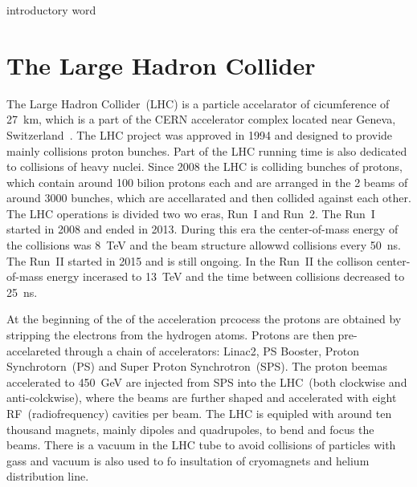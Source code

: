 \clearpage

\setcounter{secnumdepth}{4}
\setcounter{secnumdepth}{5}

introductory word

\section{The Large Hadron Collider}

The Large Hadron Collider~(LHC) is a particle accelarator of cicumference of 27~km, which is a part of the CERN accelerator complex located near Geneva, Switzerland~\cite{CERN-Brochure-2017-002-Eng, Evans:2008zzb}. The LHC project was approved in 1994 and designed to provide mainly collisions proton bunches. Part of the LHC running time is also dedicated to collisions of heavy nuclei. Since 2008 the LHC is colliding bunches of protons, which contain around 100 bilion protons each and are arranged in the 2 beams of around 3000 bunches, which are accellarated and then collided against each other. The LHC operations is divided two wo eras, Run~I and Run~2. The Run~I started in 2008 and ended in 2013. During this era the center-of-mass energy of the collisions was 8~TeV and the beam structure allowwd collisions every 50~ns. The Run~II started in 2015 and is still ongoing. In the Run~II the collison center-of-mass energy incerased to 13~TeV and the time between collisions decreased to 25~ns.

At the beginning of the of the acceleration prcocess the protons are obtained by stripping the electrons from the hydrogen atoms. Protons are then pre-accelareted through a chain of accelerators: Linac2, PS Booster, Proton Synchrotorn~(PS) and Super Proton Synchrotron~(SPS). The proton beemas accelerated to 450~GeV are injected from SPS into the LHC~(both clockwise and anti-colckwise), where the beams are further shaped and accelerated with eight RF~(radiofrequency) cavities per beam. The LHC is equipled with around ten thousand magnets, mainly dipoles and quadrupoles, to bend and focus the beams. There is a vacuum in the LHC tube to avoid collisions of particles with gass and vacuum is also used to fo insultation of cryomagnets and helium distribution line.

